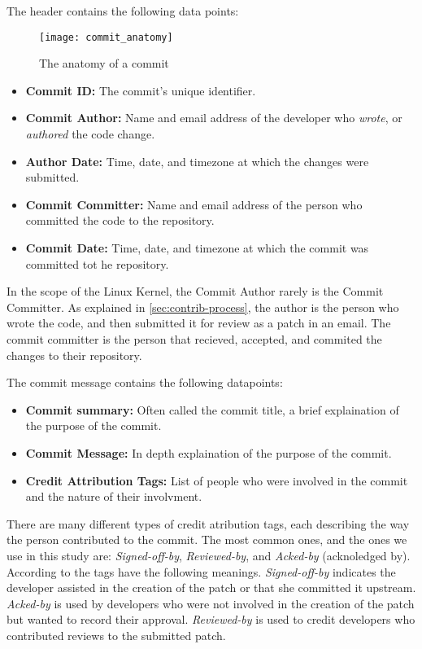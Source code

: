 The header contains the following data points:

\begin{figure}[htb]
\centering
\texttt{[image: commit\_anatomy]}
\caption{The anatomy of a commit}
\label{fig:commit_anatomy}
\end{figure}

\begin{itemize}
	\item \textbf{Commit ID:} The commit's unique identifier.
	\item \textbf{Commit Author:} Name and email address of the developer who \textit{wrote}, or \textit{authored} the code change.
	\item \textbf{Author Date:} Time, date, and timezone at which the changes were submitted.
	\item \textbf{Commit Committer:} Name and email address of the person who committed the code to the repository.
	\item \textbf{Commit Date:} Time, date, and timezone at which the commit was committed tot he repository.
\end{itemize}

In the scope of the Linux Kernel, the Commit Author rarely is the Commit Committer. As explained in \autoref{sec:contrib-process}, the author is the person who wrote the code, and then submitted it for review as a patch in an email. The commit committer is the person that recieved, accepted, and commited the changes to their repository.

The commit message contains the following datapoints:

\begin{itemize}
	\item \textbf{Commit summary:} Often called the commit title, a brief explaination of the purpose of the commit. 
	\item \textbf{Commit Message:} In depth explaination of the purpose of the commit.
	\item \textbf{Credit Attribution Tags:} List of people who were involved in the commit and the nature of their involvment. 
\end{itemize}

There are many different types of credit atribution tags, each describing the way the person contributed to the commit. The most common ones, and the ones we use in this study are: \textit{Signed-off-by}, \textit{Reviewed-by}, and \textit{Acked-by} (acknoledged by). According to  the tags have the following meanings. \textit{Signed-off-by} indicates the developer assisted in the creation of the patch or that she committed it upstream. \textit{Acked-by} is used by developers who were not involved in the creation of the patch but wanted to record their approval. \textit{Reviewed-by} is used to credit developers who contributed reviews to the submitted patch. 

